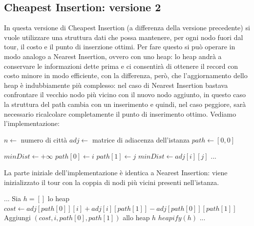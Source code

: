 \documentclass[a4paper,12pt]{report}
\begin{document}
\subsection{Cheapest Insertion: versione 2}
In questa versione di Cheapest Insertion (a differenza della versione precedente) si vuole utilizzare una struttura dati che possa mantenere, per ogni nodo fuori dal tour, il costo e il punto di inserzione ottimi. Per fare questo si può operare in modo analogo a Nearest Insertion, ovvero con uno heap: lo heap andrà a conservare le informazioni dette prima e ci consentirà di ottenere il record con costo minore in modo efficiente, con la differenza, però, che l'aggiornamento dello heap è indubbiamente più complesso: nel caso di Nearest Insertion bastava confrontare il vecchio nodo più vicino con il nuovo nodo aggiunto, in questo caso la struttura del path cambia con un inserimento e quindi, nel caso peggiore, sarà necessario ricalcolare completamente il punto di inserimento ottimo. Vediamo l'implementazione:
\begin{tcolorbox}[colframe=black, colback=white, boxrule=0.5pt, title=Cheapest Insertion Versione 2, coltitle=black, fonttitle=\bfseries, colbacktitle=white, breakable]
  \begin{algorithmic}[1]
    \State $n \gets$ numero di città
    \State $adj \gets$ matrice di adiacenza dell'istanza
    \State $path \gets [0, 0]$
    
    \State $minDist \gets +\infty$
          \State $path[0] \gets i$
          \State $path[1] \gets j$
          \State $minDist \gets adj[i][j]$
        \EndIf
      \EndFor
    \EndFor
    \State ...
  \end{algorithmic}
\end{tcolorbox}
La parte iniziale dell'implementazione è identica a Nearest Insertion: viene inizializzato il tour con la coppia di nodi più vicini presenti nell'istanza.
\begin{tcolorbox}[colframe=black, colback=white, boxrule=0.5pt, title=Cheapest Insertion Versione 2, coltitle=black, fonttitle=\bfseries, colbacktitle=white, breakable]
  \begin{algorithmic}[1]
    \State ...
    \State Sia $h = []$ lo heap
      \State $cost \gets adj[path[0]][i] + adj[i][path[1]] - adj[path[0]][path[1]]$
      \State Aggiungi $(cost, i, path[0], path[1])$ allo heap $h$
    \EndFor
    \State $heapify(h)$
    \State ...
  \end{algorithmic}
\end{tcolorbox}
\end{document}
